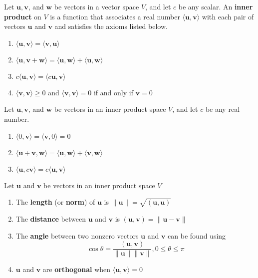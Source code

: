 \documentclass{report}
\begin{document}
\begin{tcolorbox}[title = Definition of Inner Product]
	Let $\bm{u}, \bm{v}$, and $\bm{w}$ be vectors in a vector space $V$, and let $c$ be any scalar. An \textbf{inner product} on $V$ is a function that associates a real number $\langle \bm{u}, \bm{v} \rangle$ with each pair of vectors $\bm{u}$ and $\bm{v}$ and satisfies the axioms listed below.
	
	\begin{enumerate}
		\item	$\langle \bm{u}, \bm{v} \rangle = \langle \bm{v}, \bm{u} \rangle$
		\item $\langle \bm{u}, \bm{v} + \bm{w}\rangle = \langle \bm{u}, \bm{w} \rangle + \langle \bm{u}, \bm{w} \rangle$
		\item $c \langle \bm{u}, \bm{v} \rangle = \langle c \bm{u}, \bm{v} \rangle $
		\item $\langle \bm{v}, \bm{v} \rangle \ge 0$ and $\langle \bm{v}, \bm{v} \rangle = 0$ if and only if $\bm{v} = 0$
	\end{enumerate}
\end{tcolorbox}

\begin{tcolorbox}[title = Properties of Inner Products]
		 Let $\bm{u}, \bm{v}$, and $\bm{w}$ be vectors in an inner product space $V$, and let $c$ be any real number.
	\begin{enumerate}
		\item $\langle 0, \bm{v} \rangle = \langle \bm{v}, 0 \rangle = 0$
		\item $\langle \bm{u} + \bm{v},  \bm{w} \rangle  = \langle \bm{u}, \bm{w} \rangle + \langle \bm{v}, \bm{w} \rangle $
		\item $\langle \bm{u}, c\bm{v} \rangle = c \langle \bm{u}, \bm{v} \rangle$
	\end{enumerate}
\end{tcolorbox}

\begin{tcolorbox}[title = Definitions of Length Distance and Angle]
	Let $\bm{u}$ and $\bm{v}$ be vectors in an inner product space $V$
	\begin{enumerate}
		\item The \textbf{length} (or \textbf{norm}) of $\bm{u}$ is $\| \bm{u} \| = \sqrt{(\bm{u}, \bm{u})}$
		\item The \textbf{distance} between $\bm{u}$ and $\bm{v}$ is $(\bm{u}, \bm{v}) = \| \bm{u} - \bm{v} \|$
		\item The \textbf{angle} between two nonzero vectors $\bm{u}$ and $\bm{v}$ can be found using
		$$
		\cos \theta = \frac{(\bm{u},\bm{v})}{\|\bm{u}\| \|\bm{v} \| }, 0 \le \theta \le \pi
		$$
		
		\item $\bm{u}$ and $\bm{v}$ are \textbf{orthogonal} when $\langle \bm{u}, \bm{v} \rangle = 0$
	\end{enumerate}	
\end{tcolorbox}
\end{document}
